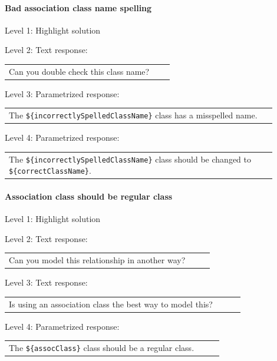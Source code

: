 \paragraph{Bad association class name spelling}

\noindent Level 1: Highlight solution \medskip

\noindent Level 2: Text response: \medskip

\begin{tabular}{|p{0.9\linewidth}}
Can you double check this class name?
\end{tabular} \medskip

\noindent Level 3: Parametrized response: \medskip

\begin{tabular}{|p{0.9\linewidth}}
The \verb|${incorrectlySpelledClassName}| class has a misspelled name.
\end{tabular} \medskip

\noindent Level 4: Parametrized response: \medskip

\begin{tabular}{|p{0.9\linewidth}}
The \verb|${incorrectlySpelledClassName}| class should be changed to \verb|${correctClassName}|.
\end{tabular} \medskip


\paragraph{Association class should be regular class}

\noindent Level 1: Highlight solution \medskip

\noindent Level 2: Text response: \medskip

\begin{tabular}{|p{0.9\linewidth}}
Can you model this relationship in another way?
\end{tabular} \medskip

\noindent Level 3: Text response: \medskip

\begin{tabular}{|p{0.9\linewidth}}
Is using an association class the best way to model this?
\end{tabular} \medskip

\noindent Level 4: Parametrized response: \medskip

\begin{tabular}{|p{0.9\linewidth}}
The \verb|${assocClass}| class should be a regular class.
\end{tabular} \medskip

